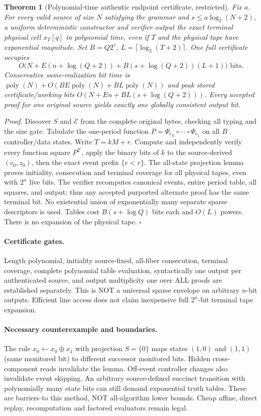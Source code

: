 \documentclass[11pt]{article}
\newtheorem{theorem}{Theorem}
\begin{document}
\begin{theorem}[Polynomial-time authentic endpoint certificate, restricted]
Fix $a$. For every valid source of size $N$ satisfying the grammar and $s\le a\log_2(N+2)$, a uniform deterministic constructor and verifier output the exact terminal physical cell $x_T[q]$ in polynomial time, even if $T$ and the physical tape have exponential magnitude. Set $B=Q2^s$, $L=\lceil\log_2(T+2)\rceil$. One full certificate occupies
\[
O\bigl(N+E(n+\log(Q+2))+B(s+\log(Q+2))(L+1)\bigr)\text{ bits}.
\]
Conservative same-realization bit time is $\operatorname{poly}(N)+O(BE\operatorname{poly}(N)+BL\operatorname{poly}(N))$ and peak stored certificate/working bits $O(N+En+BL(s+\log(Q+2)))$.
Every accepted proof for one original source yields \emph{exactly one globally consistent output bit}.
\end{theorem}
\noindent\emph{Proof.} Discover $S$ and $\mathcal E$ from the complete original bytes, checking all typing and the size gate. Tabulate the one-period function $P=\Psi_{e_E}\circ\cdots\circ\Psi_{e_1}$ on all $B$ controller/data states. Write $T=kM+r$. Compute and independently verify every function square $P^{2^i}$, apply the binary bits of $k$ to the source-derived $(c_0,z_0)$, then the exact event prefix $\{e<r\}$. The all-state projection lemma proves initiality, consecution and terminal coverage for all physical tapes, even with $2^n$ live bits. The verifier recomputes canonical events, entire period table, all squares, and output; thus any accepted purported alternate proof has the same terminal bit. No existential union of exponentially many separate sparse descriptors is used. Tables cost $B(s+\log Q)$ bits each and $O(L)$ powers. There is no expansion of the physical tape. \(\square\)
\paragraph{Certificate gates.} Length polynomial, initiality source-fixed, all-fiber consecution, terminal coverage, complete polynomial table evaluation, syntactically one output per authenticated source, and output multiplicity one over ALL proofs are established separately. This is NOT a universal sparse envelope on arbitrary $n$-bit outputs. Efficient line access does not claim inexpensive full $2^n$-bit terminal tape expansion.
\paragraph{Necessary counterexample and boundaries.} The rule $x_0\leftarrow x_0\oplus x_1$ with projection $S=\{0\}$ maps states $(1,0)$ and $(1,1)$ (same monitored bit) to different successor monitored bits. Hidden cross-component reads invalidate the lemma. Off-event controller changes also invalidate event skipping. An arbitrary source-defined succinct transition with polynomially many state bits can still demand exponential truth tables. These are barriers to this method, NOT all-algorithm lower bounds. Cheap affine, direct replay, recomputation and factored evaluators remain legal.
\end{document}
